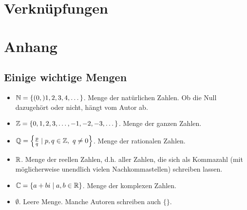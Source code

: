 \documentclass[12pt,BCOR1cm,ngerman,DIV15,fleqn,chapterprefix,headings=small]{ST1-book}
\begin{document}
\chapter{Verknüpfungen}



\backmatter
\cleardoublepage
\appendix
\chapter{Anhang}


\section*{Einige wichtige Mengen}
\begin{itemize}
 \item ${\mathbb N}= \{ (0,) 1,2,3,4,\dots \}$. Menge der natürlichen Zahlen. Ob die Null dazugehört oder nicht, hängt vom Autor ab.
 \item ${\mathbb Z}= \{0,1,2,3,\dots , -1,-2,-3,\dots \}$. Menge der ganzen Zahlen.
\item ${\mathbb Q} = \left\{\frac{p}{q} \mid p, q\in {\mathbb Z},\ q\neq 0\right\}$. Menge der rationalen Zahlen.
\item ${\mathbb R}$. Menge der reellen Zahlen, d.h. aller Zahlen, die sich als Kommazahl (mit möglicherweise unendlich vielen Nachkommastellen) schreiben lassen.
\item ${\mathbb C}= \{a+bi \mid a,b\in {\mathbb R}\}$. Menge der komplexen Zahlen.
\item $\emptyset$. Leere Menge. Manche Autoren schreiben auch $\{ \}$.
\end{itemize}
\end{document}
